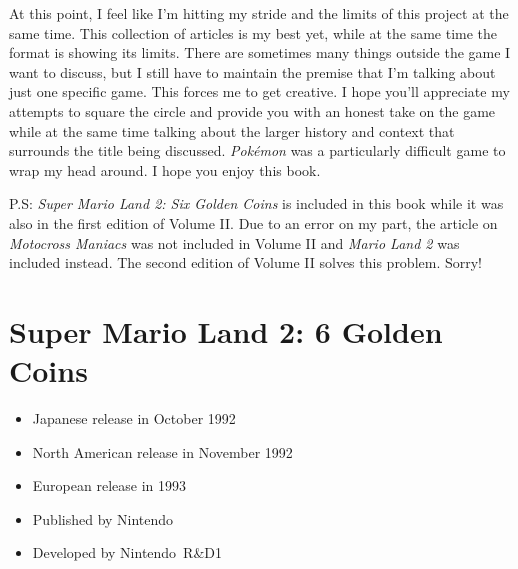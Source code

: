 \documentclass{book}
\begin{document}
At this point, I feel like I’m hitting my stride and the limits of this project at the same time. This collection of articles is my best yet, while at the same time the format is showing its limits. There are sometimes many things outside the game I want to discuss, but I still have to maintain the premise that I’m talking about just one specific game. This forces me to get creative. I hope you’ll appreciate my attempts to square the circle and provide you with an honest take on the game while at the same time talking about the larger history and context that surrounds the title being discussed. \emph{Pokémon} was a particularly difficult game to wrap my head around. I hope you enjoy this book.

P.S: \emph{Super Mario Land 2: Six Golden Coins} is included in this book while it was also in the first edition of Volume II. Due to an error on my part, the article on \emph{Motocross Maniacs} was not included in Volume II and \emph{Mario Land 2} was included instead. The second edition of Volume II solves this problem. Sorry!



















































\begingroup \chapter*{Super Mario Land 2: 6 Golden Coins} \endgroup

\begin{itemize} \setlength\itemsep{-0.4em}
\item Japanese release in October 1992
\item North American release in November 1992
\item European release in 1993
\item Published by Nintendo
\item Developed by Nintendo R\&D1
\end{itemize}\noindent
\end{document}
